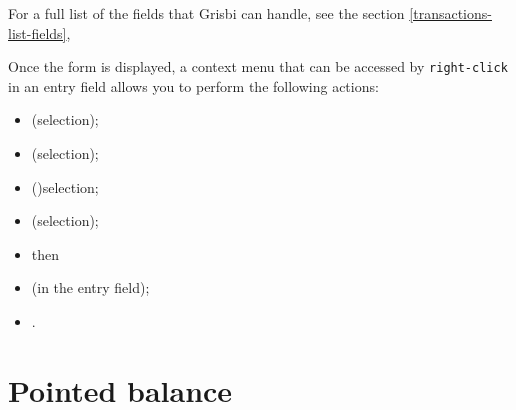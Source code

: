 For a full list of the fields that Grisbi can handle, see the section \vref{transactions-list-fields}, 


Once the form is displayed, a context menu that can be accessed by \texttt{right-click} in an entry field allows you to perform the following actions:
\begin{itemize}
	\item {} (selection);
	\item {} (selection);
	\item {} ()selection;
	\item {} (selection);
	\item[]\hspace{-12pt} then%
	\item {} (in the entry field);
	\item {}.
\end{itemize}


\section{Pointed balance\label{transactions-balance}}

